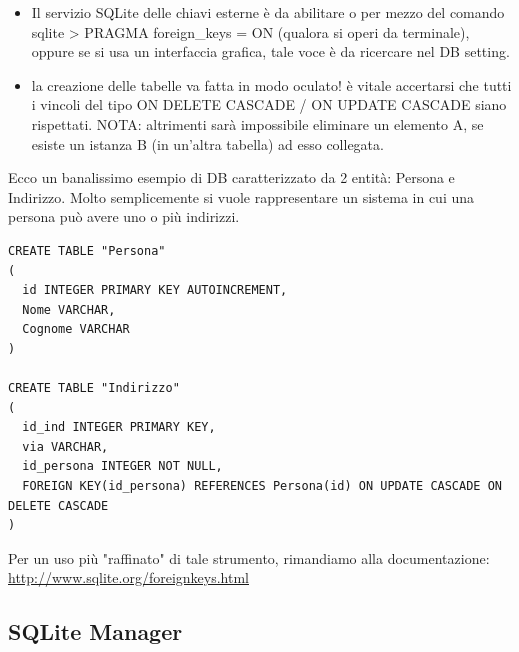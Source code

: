 \documentclass[10pt,a4paper,onecolumn]{article}
\begin{document}
\begin{itemize}
	\item Il servizio SQLite delle chiavi esterne è da abilitare o per mezzo del comando sqlite > PRAGMA foreign\_keys = ON (qualora si operi da terminale), oppure se si usa un interfaccia grafica, tale voce è da ricercare nel DB setting.
	\item la creazione delle tabelle va fatta in modo oculato! è vitale accertarsi che tutti i vincoli del tipo ON DELETE CASCADE / ON UPDATE CASCADE siano rispettati. NOTA: altrimenti sarà impossibile eliminare un elemento A, se esiste un istanza B (in un'altra tabella) ad esso collegata.
\end{itemize}

Ecco un banalissimo esempio di DB caratterizzato da 2 entità: Persona e Indirizzo. Molto semplicemente si vuole rappresentare un sistema in cui una persona può avere uno o più indirizzi.

\begin{lstlisting}
CREATE TABLE "Persona"
(
  id INTEGER PRIMARY KEY AUTOINCREMENT, 
  Nome VARCHAR, 
  Cognome VARCHAR
)

CREATE TABLE "Indirizzo" 
(
  id_ind INTEGER PRIMARY KEY, 
  via VARCHAR, 
  id_persona INTEGER NOT NULL,
  FOREIGN KEY(id_persona) REFERENCES Persona(id) ON UPDATE CASCADE ON DELETE CASCADE
)
\end{lstlisting}

Per un uso più "raffinato" di tale strumento, rimandiamo alla documentazione:\\
\url{http://www.sqlite.org/foreignkeys.html}

\subsection{SQLite Manager}
\end{document}
